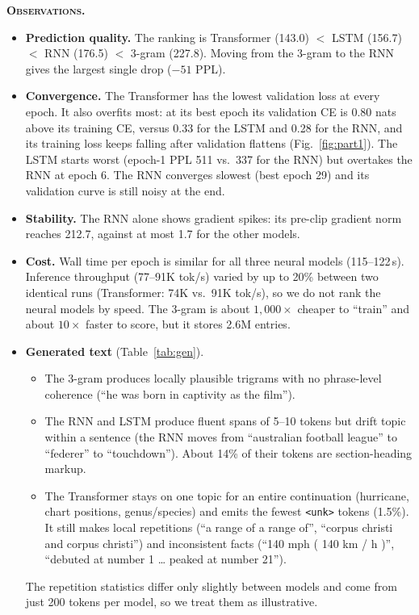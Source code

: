 \documentclass[10pt,a4paper]{article}
\newcommand{\tok}[1]{\texttt{\small #1}}
\newcommand{\obs}[1]{\textsc{\textbf{#1}}}
\begin{document}
\obs{Observations.}
\begin{itemize}
\item \textbf{Prediction quality.} The ranking is Transformer (143.0) $<$ LSTM (156.7) $<$ RNN (176.5) $<$ 3-gram (227.8). Moving from the 3-gram to the RNN gives the largest single drop ($-51$ PPL).
\item \textbf{Convergence.} The Transformer has the lowest validation loss at every epoch. It also overfits most: at its best epoch its validation CE is 0.80 nats above its training CE, versus 0.33 for the LSTM and 0.28 for the RNN, and its training loss keeps falling after validation flattens (Fig.~\ref{fig:part1}). The LSTM starts worst (epoch-1 PPL 511 vs.\ 337 for the RNN) but overtakes the RNN at epoch 6. The RNN converges slowest (best epoch 29) and its validation curve is still noisy at the end.
\item \textbf{Stability.} The RNN alone shows gradient spikes: its pre-clip gradient norm reaches 212.7, against at most 1.7 for the other models.
\item \textbf{Cost.} Wall time per epoch is similar for all three neural models (115--122\,s). Inference throughput (77--91K tok/s) varied by up to 20\% between two identical runs (Transformer: 74K vs.\ 91K tok/s), so we do not rank the neural models by speed. The 3-gram is about $1{,}000\times$ cheaper to ``train'' and about $10\times$ faster to score, but it stores 2.6M entries.
\item \textbf{Generated text} (Table~\ref{tab:gen}).
  \begin{itemize}
  \item The 3-gram produces locally plausible trigrams with no phrase-level coherence (``he was born in captivity as the film'').
  \item The RNN and LSTM produce fluent spans of 5--10 tokens but drift topic within a sentence (the RNN moves from ``australian football league'' to ``federer'' to ``touchdown''). About 14\% of their tokens are section-heading markup.
  \item The Transformer stays on one topic for an entire continuation (hurricane, chart positions, genus/species) and emits the fewest \tok{<unk>} tokens (1.5\%). It still makes local repetitions (``a range of a range of'', ``corpus christi and corpus christi'') and inconsistent facts (``140 mph ( 140 km / h )'', ``debuted at number 1 \ldots{} peaked at number 21'').
  \end{itemize}
  The repetition statistics differ only slightly between models and come from just 200 tokens per model, so we treat them as illustrative.
\end{itemize}
\end{document}
